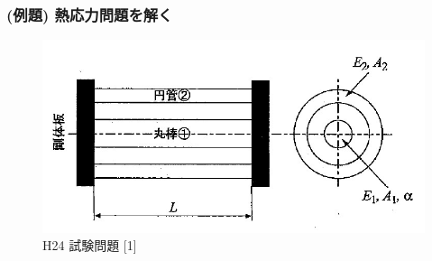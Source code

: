 \documentclass[a4paper]{jsarticle}
\begin{document}
\subsubsection{(例題) 熱応力問題を解く}
\begin{figure}[htbp]
    \begin{center}
        \includegraphics[width=120mm]{images/zairiki_image4.jpg}
        \caption{H24 試験問題 [1]}
    \end{center}
\end{figure}
\end{document}
